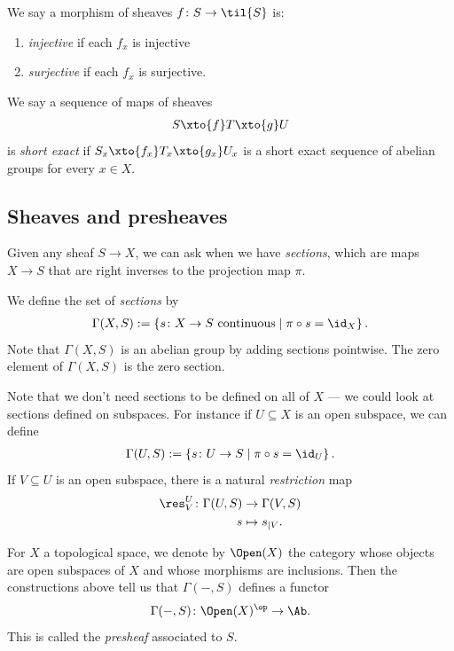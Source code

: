 \documentclass[11pt]{amsart}
\begin{document}
\begin{definition}\label{def:injective-surjective-mononomorphism-of-sheaves} 
We say a morphism of sheaves $f \colon S \to \til{S}$ is:
\begin{enumerate}
    \item \emph{injective} if each $f_x$ is injective
    \item \textit{surjective} if each $f_x$ is surjective.
\end{enumerate}
We say a sequence of maps of sheaves
\begin{align*}
    S \xto{f} T \xto{g} U
\end{align*}
is \emph{short exact} if $S_x \xto{f_x} T_x \xto{g_x} U_x$ is a short exact sequence of abelian groups for every $x\in X$.
\end{definition}

\subsection{Sheaves and presheaves}

Given any sheaf $S\to X$, we can ask when we have \emph{sections}, which are maps $X \to S$ that are right inverses to the projection map $\pi$.

\begin{definition} We define the set of \emph{sections} by
\begin{align*}
    \Gamma(X,S) := \left\{ s \colon X \to S \text{ continuous} \mid \pi\circ s = \id_X \right\}.
\end{align*}
Note that $\Gamma(X,S)$ is an abelian group by adding sections pointwise. The zero element of $\Gamma(X,S)$ is the zero section.
\end{definition}

Note that we don't need sections to be defined on all of $X$ --- we could look at sections defined on subspaces. For instance if $U \subseteq X$ is an open subspace, we can define
\begin{align*}
    \Gamma(U,S) := \left\{ s \colon U \to S \mid \pi\circ s = \id_U \right\}.
\end{align*}
%
If $V \subseteq U$ is an open subspace, there is a natural \emph{restriction} map
\begin{align*}
    \res_V^U \colon \Gamma(U,S) &\to \Gamma(V,S) \\
    s &\mapsto s_{|V}.
\end{align*}
%
\begin{notation} For $X$ a topological space, we denote by $\Open(X)$ the category whose objects are open subspaces of $X$ and whose morphisms are inclusions. Then the constructions above tell us that $\Gamma(-,S)$ defines a functor
\begin{align*}
    \Gamma(-,S) \colon \Open(X)^\op \to \Ab.
\end{align*}
This is called the \emph{presheaf} associated to $S$.
\end{notation}
\end{document}
